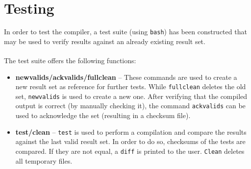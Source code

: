 \documentclass[a4paper]{scrartcl}
\let\chapter\section
\let\section\subsection
\let\subsection\subsubsection
\let\subsubsection\paragraph
\let\paragraph\subparagraph
\let\subparagraph\undefined
\begin{document}
  \chapter{Testing}
    In order to test the compiler, a test suite (using \texttt{bash}) has been 
    constructed that may be used to verify results against an already existing 
    result set. \\ \\
    The test suite offers the following functions:
    \begin{itemize}
      \item \textbf{newvalids/ackvalids/fullclean} -- These commands are used to
        create a new result set as reference for further tests. While 
        \texttt{fullclean} deletes the old set, \texttt{newvalids} is used to 
        create a new one. After verifying that the compiled output is correct 
        (by manually checking it), the command \texttt{ackvalids} can be used to 
        acknowledge the set (resulting in a checksum file). 
      \item \textbf{test/clean} -- \texttt{test} is used to perform a 
        compilation and compare the results against the last valid result set. 
        In order to do so, checksums of the tests are compared. If they are not 
        equal, a \texttt{diff} is printed to the user. \texttt{Clean} deletes
        all temporary files.
    \end{itemize}

  
  
\end{document}
